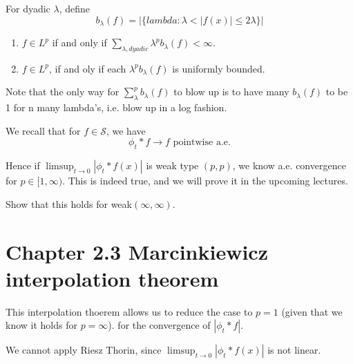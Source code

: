 \begin{definition}
    For dyadic $\lambda$, define
    \begin{equation*}
        b_\lambda(f)=|\{lambda: \lambda<|f(x)|\leq 2\lambda\}|
    \end{equation*}
\end{definition}
\begin{exercise}
    \begin{enumerate}
        \item $f\in L^p$ if and only if $\sum_{\lambda, dyadic}\lambda^pb_\lambda(f)<\infty$.
        \item $f\in L^p$, if and oly if each $\lambda^pb_\lambda(f)$ is uniformly bounded.
    \end{enumerate}
\end{exercise}
\begin{remark}
    Note that the only way for $\sum_\lambda^p b_\lambda(f)$ to blow up is to have many $b_\lambda(f)$ to be 1 for n many lambda's, i.e. blow up in a log fashion.
\end{remark}
We recall that for $f\in\mathcal{S}$, we have
\begin{equation*}
    \phi_t\ast f\to f \text{ pointwise a.e.}
\end{equation*}

Hence if $\limsup_{t\to 0}|\phi_t\ast f(x)|$ is weak type $(p,p)$, we know a.e. convergence for $p\in [1,\infty)$. This is indeed true, and we will prove it in the upcoming lectures.
\begin{exercise}
    Show that this holds for weak$ (\infty,\infty)$.
\end{exercise}

\section{Chapter 2.3 Marcinkiewicz interpolation theorem}
This interpolation thoerem allows us to reduce the case to $p=1$ (given that we know it holds for $p=\infty$). for the convergence of $|\phi_t\ast f|$.

\begin{remark}
    We cannot apply Riesz Thorin, since $\limsup_{t\to 0}|\phi_t\ast f(x)|$ is not linear.
\end{remark}

